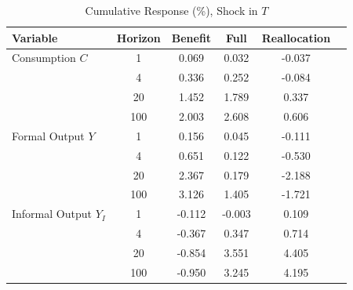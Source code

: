\begin{table}[htbp]
\centering
\caption{Cumulative Response (\%), Shock in $T$}
\label{tab:cumulative_response}
\small
\begin{tabular}{lccccc}
\toprule
Variable & Horizon & Benefit & Full & Reallocation \\
\midrule
 Consumption $C$ & 1 & 0.069 & 0.032 & -0.037 \\
  & 4 & 0.336 & 0.252 & -0.084 \\
  & 20 & 1.452 & 1.789 & 0.337 \\
  & 100 & 2.003 & 2.608 & 0.606 \\
\midrule
 Formal Output $Y$ & 1 & 0.156 & 0.045 & -0.111 \\
  & 4 & 0.651 & 0.122 & -0.530 \\
  & 20 & 2.367 & 0.179 & -2.188 \\
  & 100 & 3.126 & 1.405 & -1.721 \\
\midrule
 Informal Output $Y_I$ & 1 & -0.112 & -0.003 & 0.109 \\
  & 4 & -0.367 & 0.347 & 0.714 \\
  & 20 & -0.854 & 3.551 & 4.405 \\
  & 100 & -0.950 & 3.245 & 4.195 \\
\bottomrule
\end{tabular}
\end{table}
